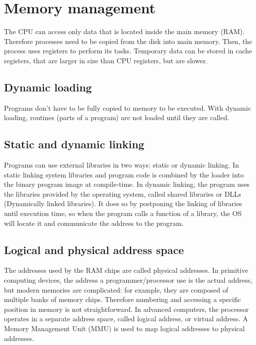 \chapter{Memory management}

The CPU can access only data that is located inside the main memory (RAM). Therefore processes need to be copied from the disk into main memory. Then, the process uses registers to perform its tasks. Temporary data can be stored in cache registers, that are larger in size than CPU registers, but are slower.


\section{Dynamic loading}
Programs don't have to be fully copied to memory to be executed. With dynamic loading, routines (parts of a program) are not loaded until they are called.

\section{Static and dynamic linking}
Programs can use external libraries in two ways: static or dynamic linking. In static linking system libraries and program code is combined by the loader into the binary program image at compile-time. In dynamic linking, the program uses the libraries provided by the operating system, called shared libraries or DLLs (Dynamically linked libraries). It does so by postponing the linking of libraries until execution time, so when the program calls a function of a library, the OS will locate it and communicate the address to the program.

\section{Logical and physical address space}
The addresses used by the RAM chips are called physical addresses. In primitive computing devices, the address a programmer/processor use is the actual address, but modern memories are complicated: for example, they are composed of multiple banks of memory chips. Therefore numbering and accessing a specific position in memory is not straightforward. In advanced computers, the processor operates in a separate address space, called logical address, or virtual address. A Memory Management Unit (MMU) is used to map logical addresses to physical addresses.

